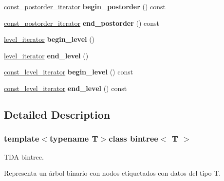 \begin{DoxyCompactItemize}
\item 
\hypertarget{classbintree_abd8fb69e96f1326b8d1745ccd1833352}{}\hyperlink{classbintree_1_1const__postorder__iterator}{const\+\_\+postorder\+\_\+iterator} {\bfseries begin\+\_\+postorder} () const \label{classbintree_abd8fb69e96f1326b8d1745ccd1833352}

\item 
\hypertarget{classbintree_a1d07a09dcecab8ac31ac5978166849d3}{}\hyperlink{classbintree_1_1const__postorder__iterator}{const\+\_\+postorder\+\_\+iterator} {\bfseries end\+\_\+postorder} () const \label{classbintree_a1d07a09dcecab8ac31ac5978166849d3}

\item 
\hypertarget{classbintree_ab806982263f4c480797e3addb07d9724}{}\hyperlink{classbintree_1_1level__iterator}{level\+\_\+iterator} {\bfseries begin\+\_\+level} ()\label{classbintree_ab806982263f4c480797e3addb07d9724}

\item 
\hypertarget{classbintree_a510c30fe888aa44af32ebeeacf61e495}{}\hyperlink{classbintree_1_1level__iterator}{level\+\_\+iterator} {\bfseries end\+\_\+level} ()\label{classbintree_a510c30fe888aa44af32ebeeacf61e495}

\item 
\hypertarget{classbintree_a294c19f33a55a82e0a535a8a3cc9eb0a}{}\hyperlink{classbintree_1_1const__level__iterator}{const\+\_\+level\+\_\+iterator} {\bfseries begin\+\_\+level} () const \label{classbintree_a294c19f33a55a82e0a535a8a3cc9eb0a}

\item 
\hypertarget{classbintree_adb0cc4036c25955ed92dd421af03001b}{}\hyperlink{classbintree_1_1const__level__iterator}{const\+\_\+level\+\_\+iterator} {\bfseries end\+\_\+level} () const \label{classbintree_adb0cc4036c25955ed92dd421af03001b}

\end{DoxyCompactItemize}


\subsection{Detailed Description}
\subsubsection*{template$<$typename T$>$class bintree$<$ T $>$}

T\+D\+A bintree.

Representa un árbol binario con nodos etiquetados con datos del tipo T.

